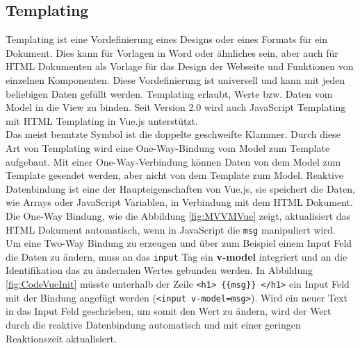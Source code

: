 \subsection*{Templating}
Templating ist eine Vordefinierung eines Designs oder eines Formats f\"ur ein Dokument. Dies kann f\"ur Vorlagen in Word oder \"ahnliches sein, aber auch f\"ur \ac{HTML} Dokumenten als Vorlage f\"ur das Design der Webseite und Funktionen von einzelnen Komponenten. Diese Vordefinierung ist universell und kann mit jeden beliebigen Daten gef\"ullt werden\cite{DictionaryTemplating}. Templating erlaubt, Werte bzw. Daten vom Model in die View zu binden. Seit Version 2.0 wird auch JavaScript Templating mit \ac{HTML} Templating in Vue.js unterst\"utzt. \\
Das meist benutzte Symbol ist die doppelte geschweifte Klammer. Durch diese Art von Templating wird eine One-Way-Bindung vom Model zum Template aufgebaut. Mit einer One-Way-Verbindung k\"onnen Daten von dem Model zum Template gesendet werden, aber nicht von dem Template zum Model\cite{AlligatorTemplating2016}.
Reaktive Datenbindung ist eine der Haupteigenschaften von Vue.js, sie speichert die Daten, wie Arrays oder JavaScript Variablen, in Verbindung mit dem \ac{HTML} Dokument. Die One-Way Bindung, wie die Abbildung \ref{fig:MVVMVue} zeigt, aktualisiert das \ac{HTML} Dokument automatisch, wenn in JavaScript die \texttt{msg} manipuliert wird.\\
 Um eine Two-Way Bindung zu erzeugen und \"uber zum Beispiel einem Input Feld die Daten zu \"andern, muss an das \texttt{input} Tag ein \textbf{v-model} integriert und an die Identifikation das zu \"andernden Wertes gebunden werden. In Abbildung \ref{fig:CodeVueInit} m\"usste unterhalb der Zeile \texttt{<h1> \{\{msg\}\} </h1>} ein Input Feld mit der Bindung angef\"ugt werden (\texttt{<input v-model=\grqq msg\grqq>})\cite{Gore2016}. Wird ein neuer Text in das Input Feld geschrieben, um somit den Wert zu \"andern, wird der Wert durch die reaktive Datenbindung automatisch und mit einer geringen Reaktionszeit aktualisiert.

